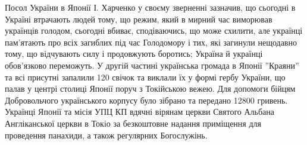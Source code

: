 \documentclass[10pt,a4paper]{article}
\begin{document}
\begin{multicols}{3}
Посол України в Японії І. Харченко у своєму зверненні зазначив, що сьогодні в Україні втрачають людей тому, що режим, який в мирний час виморював українців голодом, сьогодні вбиває, сподіваючись, що може схилити, але українці пам'ятають про всіх загиблих під час Голодомору і тих, які загинули нещодавно тому, що відчувають силу і продовжують боротись; Україна й українці обов'язково переможуть.
У другій частині українська громада в Японії ''Краяни'' та всі присутні запалили 120 свічок та виклали їх у формі гербу України, що палав у центрі столиці Японії поруч з Токійською вежею.
Для допомоги бійцям Добровольчого українського корпусу було зібрано та передано 12800 гривень.
Українці Японії та місія УПЦ КП вдячні вірянам церкви Святого Альбана Англіканської церкви в Токіо за безкоштовне надання приміщення для проведення панахиди, а також регулярних Богослужінь.

\end{multicols}

\newpage
\end{document}
